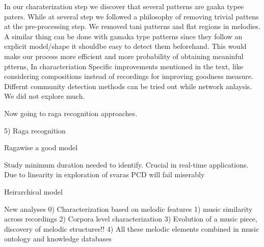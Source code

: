 In our charaterization step we discover that several patterns are gaaka typee paters. While at several step we followed a philosophy of removing trivial pattens at the pre-processing step. We removed tani patterns and flat regions in melodies. A similar thing can be done with gamaka type patterns since they follow an explicit model/shape it shouldbe easy to detect them beforehand. This would make our process more efficient and more probability of obtaining meaninful ptterns, In characteriation Specific improvements mentioned in the text, like considering compositions instead of recordings for improving goodness measure. Differnt community detection methods can be tried out while network anlaysis. We did not explore much. 


Now going to raga recognition approaches. 

5) Raga recognition

Ragawise a good model

Study minimum duration needed to identify. Crucial in real-time applications. Due to linearity in exploration of svaras PCD will fail miserably

Heirarchical model





New analyses
0) Characterization based on melodic features
1) music similarity across recordings
2) Corpora level characterization 
3) Evolution of a music piece, discovery of melodic structures!!
4) All these melodic elements combined in music ontology and knowledge databases


%
